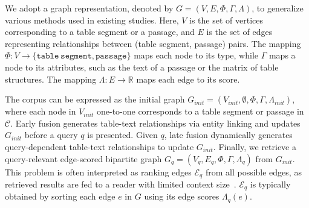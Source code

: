 We adopt a graph representation, denoted by $G = (V, E, \Phi, \Gamma, \Lambda)$, to generalize various methods used in existing studies. 
Here, $V$ is the set of vertices corresponding to a table segment or a passage, and $E$ is the set of edges representing relationships between (table segment, passage) pairs. 
The mapping $\Phi: V \rightarrow \{\texttt{table}\ \texttt{segment}, \texttt{passage}\}$ maps each node to its type, while $\Gamma$ maps a node to its attributes, such as the text of a passage or the matrix of table structures. 
The mapping $\Lambda: E \rightarrow \mathbb{R}$ maps each edge to its score.

The corpus can be expressed as the initial graph $G_{init} = (V_{init}, \emptyset, \Phi, \Gamma, \Lambda_{init})$, where each node in $V_{init}$ one-to-one corresponds to a table segment or passage in $\mathcal{C}$.  
Early fusion generates table-text relationships via entity linking and updates $G_{init}$ before a query $q$ is presented.  
Given $q$, late fusion dynamically generates query-dependent table-text relationships to update $G_{init}$.  
Finally, we retrieve a query-relevant edge-scored bipartite graph $G_q = (V_q, E_q, \Phi, \Gamma, \Lambda_q)$ from $G_{init}$.  
This problem is often interpreted as ranking edges $\mathcal{E}_q$ from all possible edges, as retrieved results are fed to a reader with limited context size~\citep{CORE, COS}.  
$\mathcal{E}_q$ is typically obtained by sorting each edge $e$ in $G$ using its edge scores $\Lambda_q(e)$.  

